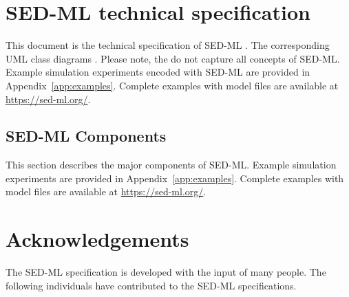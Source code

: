 \documentclass[pdftex,rgb,dvipsnames,svgnames,hyperref,table]{report}
\begin{document}

\sedmltableofcontents
\newpage


\chapter{SED-ML technical specification}
\label{chp:specification}
This document is the technical specification of SED-ML \currentLV. The corresponding UML class diagrams . Please note, the  do not capture all concepts of SED-ML. Example simulation experiments encoded with SED-ML are provided in Appendix~\ref{app:examples}. Complete examples with model files are available at \url{https://sed-ml.org/}.





\pagebreak
\section{SED-ML Components}
\label{sec:components}
This section describes the major components of SED-ML.   Example simulation experiments are provided in Appendix~\ref{app:examples}. Complete examples with model files are available at \url{https://sed-ml.org/}.%












\chapter{Acknowledgements}
\label{chp:acknowledgments}
The SED-ML specification is developed with the input of many people. The following individuals have contributed to the SED-ML specifications.
\end{document}
